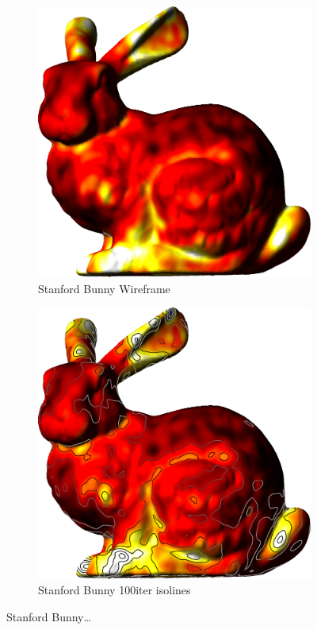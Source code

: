 \begin{figure}[ht]
{	\bigskip
	\begin{subfigure}[b]{0.48\linewidth}
		\includegraphics[width=1.0\linewidth,height=0.3\textheight,keepaspectratio]{data/acquired_meshes/bun_zipper_edited_r1_n4_v256_funcvals_100iter.png}
		\caption{Stanford Bunny Wireframe}\label{fig:bun.e}
	\end{subfigure}
	\begin{subfigure}[b]{0.48\linewidth}
		\includegraphics[width=1.0\linewidth,height=0.3\textheight,keepaspectratio]{data/acquired_meshes/bun_zipper_edited_r1_n4_v256_funcvals_isolines_100iter.png}
		\caption{Stanford Bunny 100iter isolines}\label{fig:bun.f}
	\end{subfigure}}
	{\caption[Stanford Bunny]{Stanford Bunny\ldots}\label{fig:bun}}
\end{figure}
